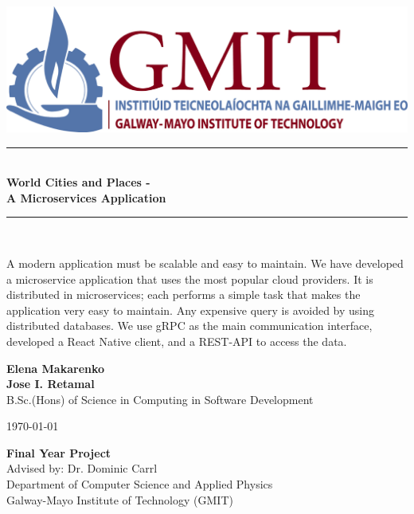 \documentclass[11pt,a4paper,oneside,openany]{book}
\newcommand{\projecttitle}{ World Cities and Places - \\ A Microservices Application}
\newcommand{\projectauthor}{Elena Makarenko  \\[0.2cm] Jose I. Retamal}
\newcommand{\projectadvisor}{Dr. Dominic Carrl}
\newcommand{\projectprogramme}{B.Sc.(Hons) of Science in Computing in Software Development}
\newcommand{\projectabstract}{A modern application must be scalable and easy to maintain. We have developed a microservice application that uses the most popular cloud providers. It is distributed in microservices; each performs a simple task that makes the application very easy to maintain. Any expensive query is avoided by using distributed databases. We use gRPC as the main communication interface, developed a React Native client, and a REST-API to access the data.}
\newcommand{\projectdate}{\today}
\begin{document}
  \begin{titlepage}
  	 \begin{center}    
  		\includegraphics{img/gmit-logo.jpg}
  	\end{center}
    \begin{minipage}[t][4cm]{\textwidth}
      \centering
      \rule{\linewidth}{0.5mm} \\[0.4cm]
      { \LARGE \bfseries \projecttitle \\[0.4cm] }
      \rule{\linewidth}{0.5mm} \\[0.8cm]
    \end{minipage}
    
      \begin{minipage}[t][5.5cm]{\textwidth}
    	\centering
    	
    	\projectabstract
    \end{minipage}
    
    \begin{minipage}[t][3.5cm]{\textwidth}
      \centering
      \textbf{\projectauthor}\\[0.5cm]
      \projectprogramme
    \end{minipage}
   

  
    \begin{minipage}[t][1cm]{\textwidth}
      \centering
      \textsc{\projectdate}
    \end{minipage}
      
    \begin{minipage}[t][3cm]{\textwidth}
      \centering
      \textbf{Final Year Project}\\[0.3cm]
      Advised by: \projectadvisor \\[0.1cm]
      Department of Computer Science and Applied Physics\\
      Galway-Mayo Institute of Technology (GMIT)
    \end{minipage}
  
   
  \end{titlepage}
   
  \setcounter{page}{2}
  \tableofcontents
  \listoffigures
  
    
 
  
  
  
  
  
  
  
  
\end{document}
